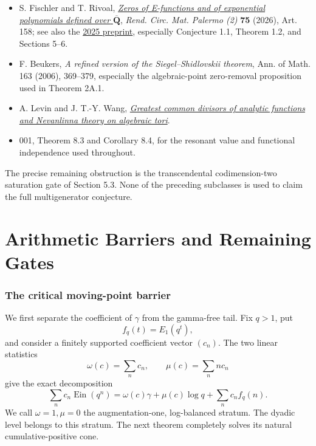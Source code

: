 \documentclass[11pt]{article}
\theoremstyle{keio}
\theoremstyle{definition}
\theoremstyle{remark}
\newcommand{\Ein}{\operatorname{Ein}}
\providecommand{\tightlist}{\setlength{\itemsep}{0pt}\setlength{\parskip}{0pt}}
\begin{document}
\begin{itemize}
\tightlist
\item
  S. Fischler and T. Rivoal, \href{https://doi.org/10.1007/s12215-026-01475-x}{\emph{Zeros of E-functions and of exponential
  polynomials defined over} \(\overline{\mathbf Q}\)},
  \emph{Rend. Circ. Mat. Palermo (2)} \textbf{75} (2026), Art. 158; see also the
  \href{https://arxiv.org/abs/2503.20345}{2025 preprint}, especially Conjecture 1.1,
  Theorem 1.2, and Sections 5--6.
\item
  F. Beukers, \emph{A refined version of the Siegel--Shidlovskii theorem},
  Ann. of Math. 163 (2006), 369--379, especially the algebraic-point
  zero-removal proposition used in Theorem 2A.1.
\item
  A. Levin and J. T.-Y. Wang, \href{https://arxiv.org/abs/1903.03876}{\emph{Greatest common divisors of analytic functions
  and Nevanlinna theory on algebraic tori}}.
\item
  001, Theorem 8.3 and Corollary 8.4, for the resonant value and functional
  independence used throughout.
\end{itemize}

The precise remaining obstruction is the transcendental codimension-two
saturation gate of Section 5.3.  None of the preceding subclasses is used to
claim the full multigenerator conjecture.

\part{Arithmetic Barriers and Remaining Gates}
\section{The critical moving-point barrier}
\label{sec:barrier}

We first separate the coefficient of \(\gamma\) from the gamma-free tail.
Fix \(q>1\), put
\[
 f_q(t)=E_1(q^t),
\]
and consider a finitely supported coefficient vector \((c_n)\).  The two
linear statistics
\[
 \omega(c)=\sum_nc_n,
 \qquad
 \mu(c)=\sum_nnc_n
\]
give the exact decomposition
\begin{equation}\label{eq:augmentation-decomposition}
 \sum_nc_n\Ein(q^n)
 =\omega(c)\gamma+\mu(c)\log q+\sum_nc_nf_q(n).
\end{equation}
We call \(\omega=1,\mu=0\) the augmentation-one, log-balanced stratum.
The dyadic level belongs to this stratum.  The next theorem completely solves
its natural cumulative-positive cone.
\end{document}
